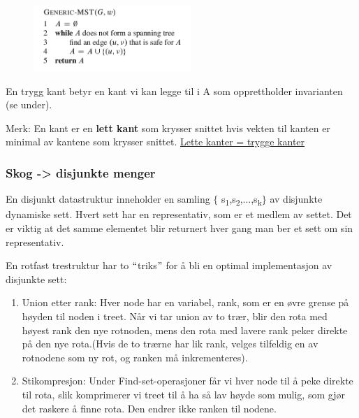 \documentclass[12pt]{report}
\begin{document}
\begin{figure}[H]
	\begin{Center}
		\includegraphics[width=2.35in,height=0.98in]{./media/image114.png}
	\end{Center}
\end{figure}



\par

En trygg kant betyr en kant vi kan legge til i A som opprettholder invarianten (se under).\par


\vspace{\baselineskip}
Merk: En kant er en \textbf{lett kant} som krysser snittet hvis vekten til kanten er minimal av kantene som krysser snittet.  \uline{Lette kanter = trygge kanter}\par


\vspace{\baselineskip}
\subsubsection*{Skog -> disjunkte menger}
En disjunkt datastruktur inneholder en samling $ \{ $ s\textsubscript{1},s\textsubscript{2},...,s\textsubscript{k}$ \} $  av disjunkte dynamiske sett. Hvert sett har en representativ, som er et medlem av settet. Det er viktig at det samme elementet blir returnert hver gang man ber et sett om sin representativ.\par


\vspace{\baselineskip}
En rotfast trestruktur har to $``$triks$"$  for å bli en optimal implementasjon av disjunkte sett:\par

\begin{enumerate}
	\item Union etter rank: Hver node har en variabel, rank, som er en øvre grense på høyden til noden i treet. Når vi tar union av to trær, blir den rota med høyest rank den nye rotnoden, mens den rota med lavere rank peker direkte på den nye rota.(Hvis de to trærne har lik rank, velges tilfeldig en av rotnodene som ny rot, og ranken må inkrementeres). \par

	\item Stikompresjon: Under Find-set-operasjoner får vi hver node til å peke direkte til rota, slik komprimerer vi treet til å ha så lav høyde som mulig, som gjør det raskere å finne rota. Den endrer ikke ranken til nodene. 
\end{enumerate}\par
\end{document}

